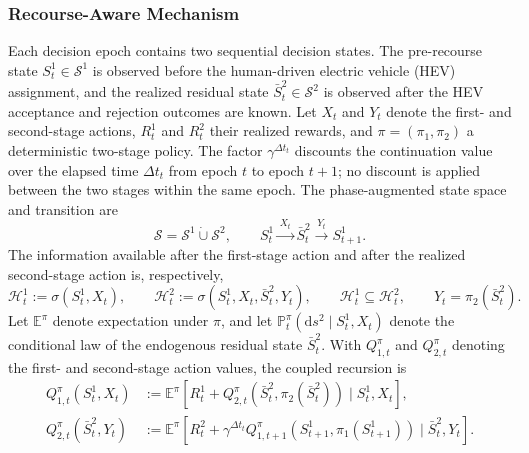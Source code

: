 \subsubsection{Recourse-Aware Mechanism}
\label{sec:recourse_aware_mechanism}

Each decision epoch contains two sequential decision states. The pre-recourse state $S_t^1\in\mathcal S^1$ is observed before the human-driven electric vehicle (HEV) assignment, and the realized residual state $\bar S_t^2\in\mathcal S^2$ is observed after the HEV acceptance and rejection outcomes are known. Let $X_t$ and $Y_t$ denote the first- and second-stage actions, $R_t^1$ and $R_t^2$ their realized rewards, and $\pi=(\pi_1,\pi_2)$ a deterministic two-stage policy. The factor $\gamma^{\Delta t_t}$ discounts the continuation value over the elapsed time $\Delta t_t$ from epoch $t$ to epoch $t+1$; no discount is applied between the two stages within the same epoch. The phase-augmented state space and transition are
\begin{equation}\mathcal S=\mathcal S^1\mathbin{\dot\cup}\mathcal S^2,\qquad S_t^1\xrightarrow{\,X_t\,}\bar S_t^2\xrightarrow{\,Y_t\,}S_{t+1}^1.\label{eq:recourse_state_sequence}\end{equation}
The information available after the first-stage action and after the realized second-stage action is, respectively,
\begin{equation}\mathcal H_t^1:=\sigma(S_t^1,X_t),\qquad \mathcal H_t^2:=\sigma(S_t^1,X_t,\bar S_t^2,Y_t),\qquad \mathcal H_t^1\subseteq\mathcal H_t^2,\qquad Y_t=\pi_2(\bar S_t^2).\label{eq:recourse_information_sets}\end{equation}
Let $\mathbb E^\pi$ denote expectation under $\pi$, and let $\mathbb P_t^\pi(\mathrm d s^2\mid S_t^1,X_t)$ denote the conditional law of the endogenous residual state $\bar S_t^2$. With $Q_{1,t}^\pi$ and $Q_{2,t}^\pi$ denoting the first- and second-stage action values, the coupled recursion is
\begin{equation}\begin{aligned}Q_{1,t}^{\pi}(S_t^1,X_t)&:=\mathbb E^\pi\!\left[R_t^1+Q_{2,t}^{\pi}\!\left(\bar S_t^2,\pi_2(\bar S_t^2)\right)\mid S_t^1,X_t\right],\\ Q_{2,t}^{\pi}(\bar S_t^2,Y_t)&:=\mathbb E^\pi\!\left[R_t^2+\gamma^{\Delta t_t}Q_{1,t+1}^{\pi}\!\left(S_{t+1}^1,\pi_1(S_{t+1}^1)\right)\mid\bar S_t^2,Y_t\right].\end{aligned}\label{eq:recourse_coupled_recursion}\end{equation}

